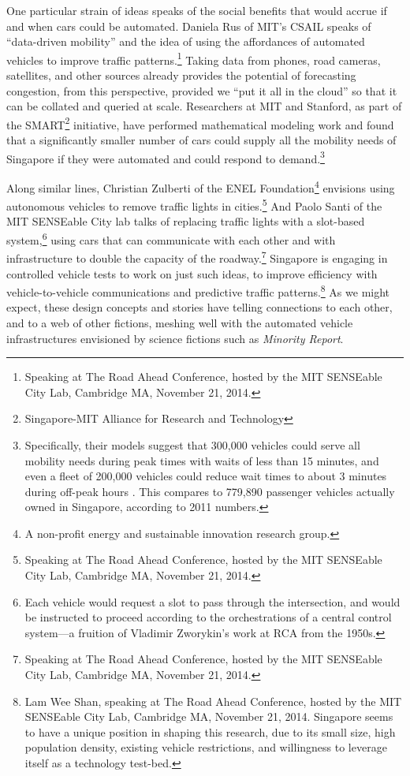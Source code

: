One particular strain of ideas speaks of the
social benefits that would accrue if and when cars could be automated.
Daniela Rus of MIT's CSAIL speaks of ``data-driven mobility'' and the
idea of using the affordances of automated vehicles to improve traffic
patterns.\footnote{Speaking at The Road Ahead Conference, hosted by
  the MIT SENSEable City Lab, Cambridge MA, November 21, 2014.} Taking
data from phones, road cameras, satellites, and other 
sources already provides the potential of forecasting congestion, from
this perspective,
provided we ``put it all in the cloud'' so that it can be collated and
queried at scale. Researchers at MIT and Stanford, as part of the
SMART\footnote{Singapore-MIT Alliance for Research and Technology} initiative, have
performed mathematical modeling work and found that a
significantly smaller number of cars could supply all the mobility
needs of Singapore if they were automated and could respond to
demand.\footnote{Specifically, their models suggest that 300,000
  vehicles could serve 
all mobility needs during peak times with waits of less than 15
minutes, and even a fleet of 200,000 vehicles could reduce wait times
to about 3 minutes during off-peak hours \cite{frazzoliSingapore}. This
compares to 779,890 passenger vehicles actually owned in Singapore,
according to 2011 numbers.}

Along similar
lines, Christian Zulberti of the ENEL Foundation\footnote{A non-profit
  energy and sustainable innovation research group.} envisions using
autonomous vehicles to remove traffic lights in
cities.\footnote{Speaking at The Road Ahead Conference, hosted by
  the MIT SENSEable City Lab, Cambridge MA, November 21, 2014.} And Paolo
Santi of the MIT SENSEable City lab talks of replacing traffic lights
with a slot-based system,\footnote{Each vehicle would request a slot to pass through the
intersection, and would be instructed to proceed according to the
orchestrations of a central control system---a fruition of
Vladimir Zworykin's work at RCA from the 1950s.} using cars that can communicate with each
other and with infrastructure to double the capacity of the
roadway.\footnote{Speaking at The Road Ahead Conference, hosted by
  the MIT SENSEable City Lab, Cambridge MA, November 21, 2014.}  Singapore is engaging in
controlled vehicle tests to work on just such ideas, to improve
efficiency with vehicle-to-vehicle communications and predictive traffic
patterns.\footnote{Lam Wee Shan, speaking at The Road Ahead Conference, hosted by
  the MIT SENSEable City Lab, Cambridge MA, November 21, 2014.
  Singapore seems to have a unique position in shaping this research,
  due to its small size, high population density, existing vehicle
  restrictions, and willingness to 
  leverage itself as a technology test-bed.} As we
might expect, these
design concepts and stories have telling connections to each other, and
to a web of other fictions, meshing well with the automated vehicle
infrastructures envisioned by science fictions such as \emph{Minority Report}.

